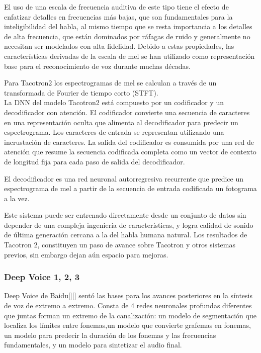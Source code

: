 El uso de una escala de frecuencia auditiva de este tipo tiene el efecto de enfatizar detalles en frecuencias más bajas, que son fundamentales para la inteligibilidad del habla, al mismo tiempo que se resta importancia a los detalles de alta frecuencia, que están dominados por ráfagas de ruido y generalmente no necesitan ser modelados con alta fidelidad. Debido a estas propiedades, las características derivadas de la escala de mel se han utilizado como representación base para el reconocimiento de voz durante muchas décadas. 

Para Tacotron2 los espectrogramas de mel se calculan a través de un transformada de Fourier de tiempo corto (STFT). \\

La DNN del modelo Tacotron2 está compuesto por un codificador y un decodificador con atención. El codificador convierte una secuencia de caracteres en una representación oculta que alimenta al decodificador para predecir un espectrograma. Los caracteres de entrada se representan utilizando una incrustación de caracteres. La salida del codificador es consumida por una red de atención que resume la secuencia codificada completa como un vector de contexto de longitud fija para cada paso de salida del decodificador.

El decodificador es una red neuronal autorregresiva recurrente que predice un espectrograma de mel a partir de la secuencia de entrada codificada un fotograma a la vez. 

Este sistema puede ser entrenado directamente desde un conjunto de datos sin depender de una compleja ingeniería de características, y logra calidad de sonido de última generación cercana a la del habla humana natural. Los resultados de Tacotron 2, constituyen un paso de avance sobre Tacotron y otros sistemas previos, sin embargo dejan aún espacio para mejoras. 


\subsubsection{Deep Voice 1, 2, 3}
Deep Voice de Baidu[\cite{deep-voice}][\cite{arik2018neural}] sentó las bases para los avances posteriores en la síntesis de voz de extremo a extremo. Consta de 4 redes neuronales profundas diferentes que juntas forman un extremo de la canalización: un modelo de segmentación que localiza los límites entre fonemas,un modelo que convierte grafemas en fonemas, un modelo para predecir la duración de los fonemas y las frecuencias fundamentales, y un modelo para sintetizar el audio final.

